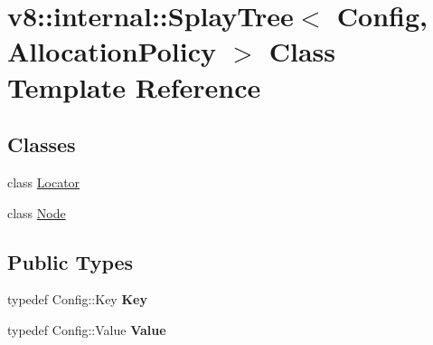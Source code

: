 \hypertarget{classv8_1_1internal_1_1SplayTree}{}\section{v8\+:\+:internal\+:\+:Splay\+Tree$<$ Config, Allocation\+Policy $>$ Class Template Reference}
\label{classv8_1_1internal_1_1SplayTree}
\subsection*{Classes}
\begin{DoxyCompactItemize}
\item 
class \mbox{\hyperlink{classv8_1_1internal_1_1SplayTree_1_1Locator}{Locator}}
\item 
class \mbox{\hyperlink{classv8_1_1internal_1_1SplayTree_1_1Node}{Node}}
\end{DoxyCompactItemize}
\subsection*{Public Types}
\begin{DoxyCompactItemize}
\item 
\mbox{\label{classv8_1_1internal_1_1SplayTree_a37fb72d02bb9916a61b98b985bd376ba}} 
typedef Config\+::\+Key {\bfseries Key}
\item 
\mbox{\label{classv8_1_1internal_1_1SplayTree_aa2d8e0e29b39457fa56226c8e18c41f7}} 
typedef Config\+::\+Value {\bfseries Value}
\end{DoxyCompactItemize}
